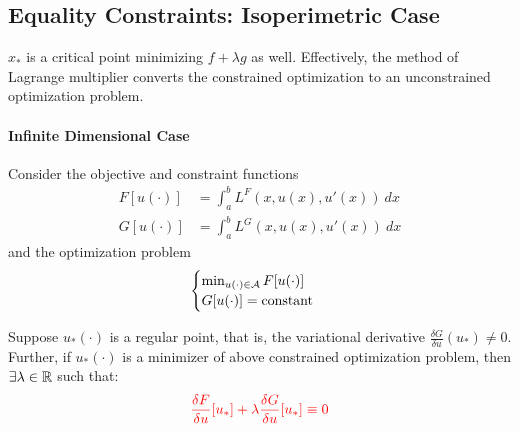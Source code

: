 \documentclass{article}
\begin{document}
	\subsection{Equality Constraints: Isoperimetric Case}
	\begin{remark}
		$x_*$ is a critical point minimizing $f + \lambda g$ as well. Effectively, the method of Lagrange multiplier converts the constrained optimization to an unconstrained optimization problem.
	\end{remark}
	
	\paragraph{Infinite Dimensional Case} Consider the objective and constraint functions
	\begin{align}
		F[u(\cdot)] &= \int_a^b L^F(x, u(x), u'(x))\ dx \\
		G[u(\cdot)] &= \int_a^b L^G(x, u(x), u'(x))\ dx
	\end{align}
	and the optimization problem
	\begin{align}
		\begin{cases}
			\min_{u(\cdot) \in \mathcal{{A}}} F[u(\cdot)] \\
			G[u(\cdot)] = \text{{constant}}
		\end{cases}
	\end{align}

	\begin{theorem}
		Suppose $u_*(\cdot)$ is a regular point, that is, the variational derivative $\frac{\delta G}{\delta u}(u_*) \neq 0$.\\
		Further, if $u_*(\cdot)$ is a minimizer of above constrained optimization problem, then $\exists \lambda \in \mathbb{R}$ such that:
		\begin{align}
			\textcolor{red}{\frac{\delta F}{\delta u}[u_*] + \lambda \frac{\delta G}{\delta u}[u_*] \equiv 0}
		\end{align}
	\end{theorem}
\end{document}
